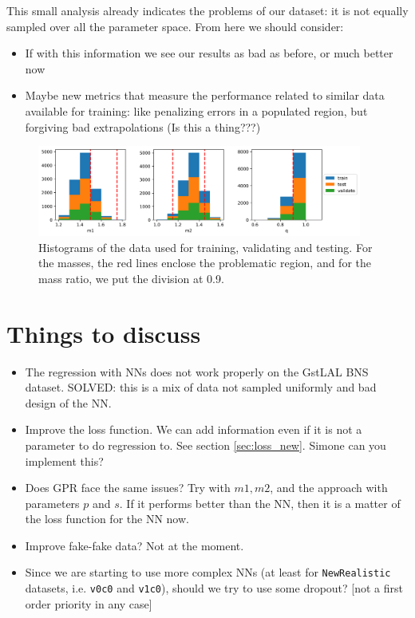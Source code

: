 \documentclass[prd,aps,twocolumn,a4paper,showkeys,nofootinbib]{article}
\begin{document}
This small analysis already indicates the problems of our dataset: it is not equally sampled over all the parameter space. From here we should consider:
\begin{itemize}
\item If with this information we see our results as bad as before, or much better now
\item Maybe new metrics that measure the performance related to similar data available for training: like penalizing errors in a populated region, but forgiving bad extrapolations (Is this a thing???)
\end{itemize}

\begin{figure}[]
  \center
  \includegraphics[width=0.95\textwidth]{./Figs/hists_data}
  \caption{\label{fig:analysisGstLAL} Histograms of the data used for training, validating and testing. For the masses, the red lines enclose the problematic region, and for the mass ratio, we put the division at 0.9.}
\end{figure}





\section{Things to discuss}
\begin{itemize}
\item The regression with NNs does not work properly on the GstLAL BNS dataset. SOLVED: this is a mix of  data not sampled uniformly and bad design of the NN.

\item Improve the loss function. We can add information even if it is not a parameter to do regression to. See section \ref{sec:loss_new}. Simone can you implement this?

\item Does GPR face the same issues? Try with $m1,m2$, and the approach with parameters $p$ and $s$. If it performs better than the NN, then it is a matter of the loss function for the NN now. 

\item Improve fake-fake data? Not at the moment.

\item Since we are starting to use more complex NNs (at least for \texttt{NewRealistic} 
datasets, i.e. \texttt{v0c0} and \texttt{v1c0}), should we try to use some dropout?
[not a first order priority in any case]
\end{itemize}

\end{document}
